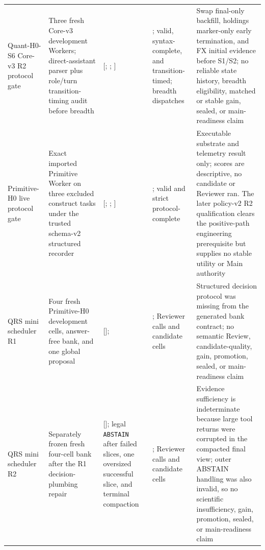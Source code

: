 \begin{table}[t]
\begin{tabular}{p{}p{}p{}p{}p{}}
Quant-H0-S6 Core-v3 R2 protocol gate & Three fresh Core-v3 development
Workers; direct-assistant parser plus role/turn transition-timing audit before
breadth & [\SsixCoreVthreeGateSwapOfficial{};
\SsixCoreVthreeGateHoldingsOfficial{};
\SsixCoreVthreeGateFxOfficial{}] & \SsixCoreVthreeGateStatus{};
\SsixCoreVthreeGateValidCells{} valid,
\SsixCoreVthreeGateSyntaxComplete{} syntax-complete, and
\SsixCoreVthreeGateTimingComplete{} transition-timed; breadth dispatches
\SsixCoreVthreeGateBreadthDispatches{} & Swap final-only backfill, holdings
marker-only early termination, and FX initial evidence before S1/S2; no reliable
state history, breadth eligibility, matched or stable gain, sealed, or
main-readiness claim \\

Primitive-H0 live protocol gate & Exact imported Primitive Worker on three
excluded construct tasks under the trusted schema-v2 structured recorder &
[\PrimitiveProtocolGateHoldings{}; \PrimitiveProtocolGateFX{};
\PrimitiveProtocolGateSwap{}] & \PrimitiveProtocolGateStatus{};
\PrimitiveProtocolGateCells{} valid and strict protocol-complete & Executable
substrate and telemetry result only; scores are descriptive, no candidate or
Reviewer ran. The later policy-v2 R2 qualification clears the positive-path
engineering prerequisite but supplies no stable utility or Main authority \\

QRS mini scheduler R1 & Four fresh Primitive-H0 development cells, answer-free
bank, and one global proposal & [\MiniROneHZeroVector{}];
\MiniROneDecision{} & \MiniROneStatus{}; \MiniROneReviewerCalls{} Reviewer
calls and \MiniROneCandidateCells{} candidate cells & Structured decision
protocol was missing from the generated bank contract; no semantic Review,
candidate-quality, gain, promotion, sealed, or main-readiness claim \\

QRS mini scheduler R2 & Separately frozen fresh four-cell bank after the R1
decision-plumbing repair & [\MiniRTwoHZeroVector{}]; legal
\texttt{ABSTAIN} after \MiniRTwoTraceFailures{} failed slices, one oversized
successful slice, and terminal compaction &
\MiniRTwoStatus{}; \MiniRTwoReviewerCalls{} Reviewer calls and
\MiniRTwoCandidateCells{} candidate cells & Evidence sufficiency is
indeterminate because large tool returns were corrupted in the compacted final
view; outer ABSTAIN handling was also invalid, so no scientific insufficiency,
gain, promotion, sealed, or main-readiness claim \\


\end{tabular}
\end{table}
